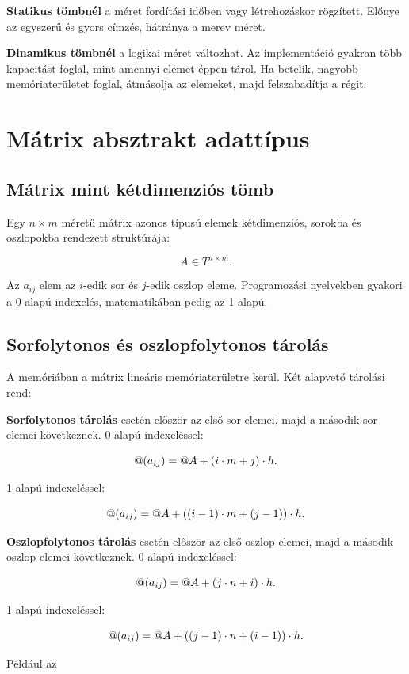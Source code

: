 \textbf{Statikus tömbnél} a méret fordítási időben vagy létrehozáskor rögzített. Előnye az egyszerű és gyors címzés, hátránya a merev méret.

\textbf{Dinamikus tömbnél} a logikai méret változhat. Az implementáció gyakran több kapacitást foglal, mint amennyi elemet éppen tárol. Ha betelik, nagyobb memóriaterületet foglal, átmásolja az elemeket, majd felszabadítja a régit.

\section{Mátrix absztrakt adattípus}

\subsection{Mátrix mint kétdimenziós tömb}

Egy $n\times m$ méretű mátrix azonos típusú elemek kétdimenziós, sorokba és oszlopokba rendezett struktúrája:

\[
A\in T^{n\times m}.
\]

Az $a_{ij}$ elem az $i$-edik sor és $j$-edik oszlop eleme. Programozási nyelvekben gyakori a 0-alapú indexelés, matematikában pedig az 1-alapú.

\subsection{Sorfolytonos és oszlopfolytonos tárolás}

A memóriában a mátrix lineáris memóriaterületre kerül. Két alapvető tárolási rend:

\textbf{Sorfolytonos tárolás} esetén először az első sor elemei, majd a második sor elemei következnek. 0-alapú indexeléssel:

\[
@(a_{ij})=@ A+(i\cdot m+j)\cdot h.
\]

1-alapú indexeléssel:

\[
@(a_{ij})=@ A+((i-1)\cdot m+(j-1))\cdot h.
\]

\textbf{Oszlopfolytonos tárolás} esetén először az első oszlop elemei, majd a második oszlop elemei következnek. 0-alapú indexeléssel:

\[
@(a_{ij})=@ A+(j\cdot n+i)\cdot h.
\]

1-alapú indexeléssel:

\[
@(a_{ij})=@ A+((j-1)\cdot n+(i-1))\cdot h.
\]

Például az

